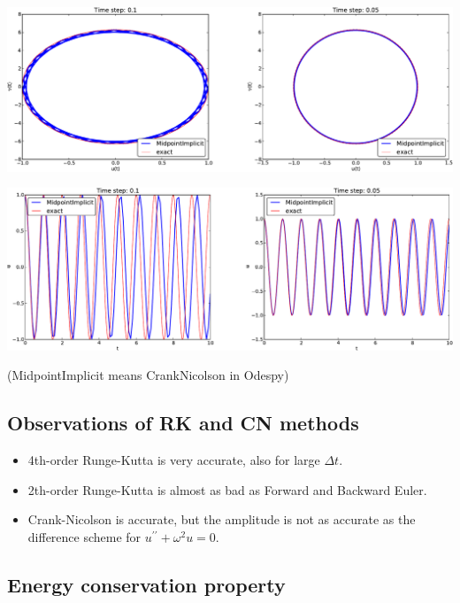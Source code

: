 \documentclass[%
oneside,                 %
final,                   %
10pt]{article}
\begin{document}
\centerline{\includegraphics[width=1.0\linewidth]{fig-vib/vib_CN_10_pp.pdf}}





\centerline{\includegraphics[width=1.0\linewidth]{fig-vib/vib_CN_10_u.pdf}}



(MidpointImplicit means CrankNicolson in Odespy)

\subsection*{Observations of RK and CN methods}

\begin{itemize}
  \item 4th-order Runge-Kutta is very accurate, also for large $\Delta t$.

  \item 2th-order Runge-Kutta is almost as bad as Forward and Backward
    Euler.

  \item Crank-Nicolson is accurate, but the amplitude is not as accurate
    as the difference scheme for $u^{\prime\prime}+\omega^2u=0$.
\end{itemize}

\noindent
\subsection*{Energy conservation property}
\end{document}
